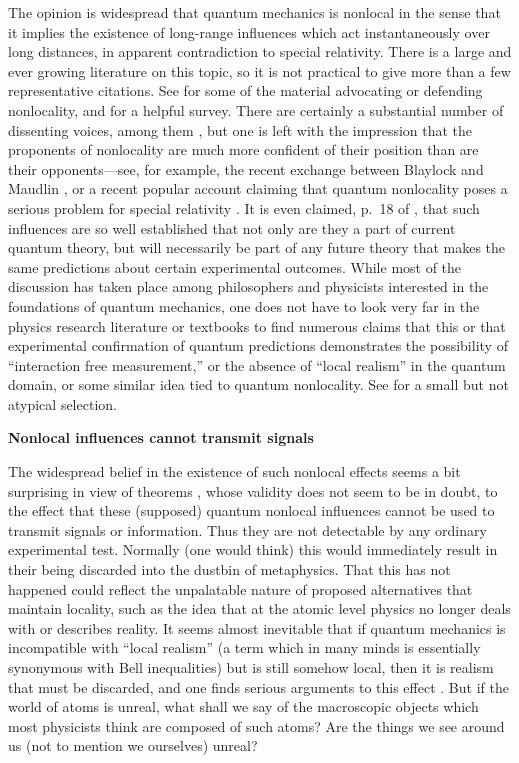 \documentclass[12pt]{article} %
\def\outl#1{\par{\medskip\noindent\hspace*{.5cm}\bf
      \mathversion{bold}#1\mathversion{normal}\smallskip} }
\def\np{} \def\xa{} \def\xb{} \def\xn{} \def\xp{}
\def\outl#1{} \def\np{} \def\xa{} \def\xb{} \def\xn{} \def\xp{}
\def\outl#1{\par{\medskip\noindent\hspace*{.5cm}\bf
      \mathversion{bold}#1\mathversion{normal}\smallskip} }
\def\np{\newpage }\def\xn{\nopagebreak }\def\xp{\pagebreak }
\begin{document}
The opinion is widespread that quantum mechanics is nonlocal in the sense that
it implies the existence of long-range influences which act instantaneously
over long distances, in apparent contradiction to special relativity.  There
is a large and ever growing literature on this topic, so it is not practical
to give more than a few representative citations. See
%
\cite{Bll81,HyRd83,Bll90b,Albr92,PpRh94,Pty95,Glds96,SrSc97,Mdln02,Shmn04,%
ElDl05,dEsp06,Nrsn06,Shmn07,Ldsa08}
%
for some of the material advocating or defending nonlocality, and
\cite{Brkv07} for a helpful survey. There are certainly a substantial number
of dissenting voices, among them %
\cite{Fne82,Fne89,dMyn86,dMao94,dMyn02,Mrmn99,SmRv07,BrZk10}, 
%
but one is left with the impression that the proponents of nonlocality are
much more confident of their position than are their opponents---see, for
example, the recent exchange between Blaylock \cite{Blyl10} and Maudlin
\cite{Mdln10}, or a recent popular account claiming that quantum nonlocality
poses a serious problem for special relativity \cite{AlGl09}.  It is even
claimed, p.~18 of \cite{dEsp06}, that such influences are so well established
that not only are they a part of current quantum theory, but will necessarily
be part of any future theory that makes the same predictions about certain
experimental outcomes. While most of the discussion has taken place among
philosophers and physicists interested in the foundations of quantum
mechanics, one does not have to look very far in the physics research
literature or textbooks to find numerous claims that this or that experimental
confirmation of quantum predictions demonstrates the possibility of
``interaction free measurement,'' or the absence of ``local realism'' in the
quantum domain, or some similar idea tied to quantum nonlocality. See
%
\cite{DGao97,Kwao99,BnCS04s,WARZ05,DGrf05b,Ynao06,Grao07,MlLl08}
%
for a small but not atypical selection.

\xb
\outl{Nonlocal influences cannot transmit signals}
\xa

The widespread belief in the existence of such nonlocal effects seems a bit
surprising in view of theorems \cite{GhRW80,Brao00}, whose validity does not
seem to be in doubt, to the effect that these (supposed) quantum nonlocal
influences cannot be used to transmit signals or information. Thus they are
not detectable by any ordinary experimental test.  Normally (one would think)
this would immediately result in their being discarded into the dustbin of
metaphysics.  That this has not happened could reflect the unpalatable nature
of proposed alternatives that maintain locality, such as the idea that at the
atomic level physics no longer deals with or describes reality.  It seems
almost inevitable that if quantum mechanics is incompatible with ``local
realism'' (a term which in many minds is essentially synonymous with Bell
inequalities) but is still somehow local, then it is realism that must be
discarded, and one finds serious arguments to this effect \cite{CvFS07}.  But
if the world of atoms is unreal, what shall we say of the macroscopic objects
which most physicists think are composed of such atoms?  Are the things we see
around us (not to mention we ourselves) unreal?
\end{document}
